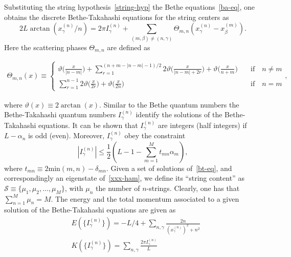 \documentclass[twocolumn,superscriptaddress,prb,10pt]{revtex4-1}
\begin{document}
Substituting the string hypothesis~\eqref{string-hyp} the Bethe 
equations~\eqref{ba-eq}, one obtains the discrete Bethe-Takahashi equations 
for the string centers as 
%
\begin{equation}
2L\arctan(x_\gamma^{(n)}/n)=2\pi I_\gamma^{(n)}+\sum\limits_{(m,\beta)
\ne(n,\gamma)}\Theta_{m,n}(x_\gamma^{(n)}-x_\beta^{(m)}).
\label{bt-eq}
\end{equation}
%
Here the scattering phases $\Theta_{m,n}$ are defined as 
%
\begin{widetext}
\begin{eqnarray}
\nonumber\Theta_{m,n}(x)\equiv\left\{\begin{array}{cc}
\vartheta\big(\frac{x}{|n-m|}\big)+\!\!\!\!\!\sum
\limits_{r=1}^{(n+m-|n-m|-1)/2}\!\!\!\!\!2\vartheta\big(\frac{x}
{|n-m|+2r}\big)+\vartheta\big(\frac{x}{n+m}\big) & \quad\mbox{if}
\quad n\ne m\\\sum\limits_{r=1}^{n-1}2\vartheta\big(\frac{x}{2r}\big)+
\vartheta\big(\frac{x}{2n}\big) & \quad\mbox{if}\quad n=m
\end{array}\right.,
\end{eqnarray}
\end{widetext}
%
where $\vartheta(x)\equiv 2\arctan(x)$. Similar to the Bethe quantum numbers 
the Bethe-Takahashi quantum numbers $I_{\gamma}^{(n)}$ identify the solutions 
of the Bethe-Takahashi equations. It can be shown that $I_\gamma^{(n)}$ are 
integers (half integers) if $L-\alpha_n$ is odd (even). Moreover, 
$I_\gamma^{(n)}$ obey the constraint 
%
\begin{equation}
\label{bt-bounds}
|I_\gamma^{(n)}|\le\frac{1}{2}(L-1-\sum\limits_{m=1}^Mt_{mn}\alpha_m),
\end{equation}
%
where $t_{mn}\equiv 2\textrm{min}(m,n)-\delta_{mn}$. 
Given a set of solutions of~\eqref{bt-eq}, and correspondingly an eigenstate 
of~\eqref{xxx-ham}, we define its ``string content'' as ${\mathcal S}\equiv
\{\mu_1,\mu_2,\dots,\mu_M\}$, with $\mu_n$ the number of $n$-strings. Clearly, 
one has that $\sum_{n=1}^M\mu_n=M$. The energy and the total momentum 
associated to a given solution of the Bethe-Takahashi equations are given as 
%
\begin{align}
& E(\{I_\gamma^{(n)}\})=-L/4+\sum\limits_{n,\gamma}\frac{2n}{
(x_\gamma^{(n)})^2+n^2}\\
& K(\{I_\gamma^{(n)}\})=\sum\limits_{n,\gamma}\frac{2\pi 
I_\gamma^{(n)}}{L}
\end{align}
%

\end{document}
